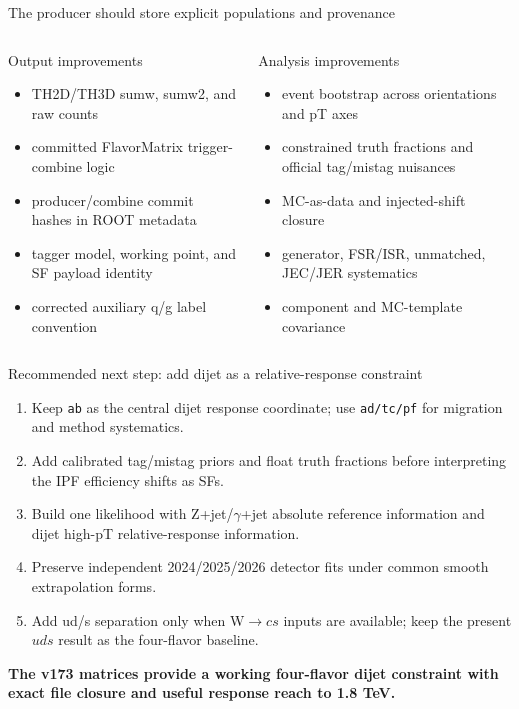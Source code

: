 \documentclass[aspectratio=169,10pt]{beamer}
\begin{document}
\begin{frame}{The producer should store explicit populations and provenance}
\begin{columns}[T,onlytextwidth]
\begin{block}{Output improvements}
\begin{itemize}
\item TH2D/TH3D sumw, sumw2, and raw counts
\item committed FlavorMatrix trigger-combine logic
\item producer/combine commit hashes in ROOT metadata
\item tagger model, working point, and SF payload identity
\item corrected auxiliary q/g label convention
\end{itemize}
\end{block}
\begin{block}{Analysis improvements}
\begin{itemize}
\item event bootstrap across orientations and pT axes
\item constrained truth fractions and official tag/mistag nuisances
\item MC-as-data and injected-shift closure
\item generator, FSR/ISR, unmatched, JEC/JER systematics
\item component and MC-template covariance
\end{itemize}
\end{block}
\end{columns}
\end{frame}

\begin{frame}{Recommended next step: add dijet as a relative-response constraint}
\begin{enumerate}
\item Keep \texttt{ab} as the central dijet response coordinate; use \texttt{ad/tc/pf} for migration and method systematics.
\item Add calibrated tag/mistag priors and float truth fractions before interpreting the IPF efficiency shifts as SFs.
\item Build one likelihood with Z+jet/$\gamma$+jet absolute reference information and dijet high-pT relative-response information.
\item Preserve independent 2024/2025/2026 detector fits under common smooth extrapolation forms.
\item Add ud/s separation only when W$\to cs$ inputs are available; keep the present $uds$ result as the four-flavor baseline.
\end{enumerate}
\vfill
\begin{center}
\color{cmsgreen}\textbf{The v173 matrices provide a working four-flavor dijet constraint with exact file closure and useful response reach to 1.8 TeV.}
\end{center}
\end{frame}
\end{document}
